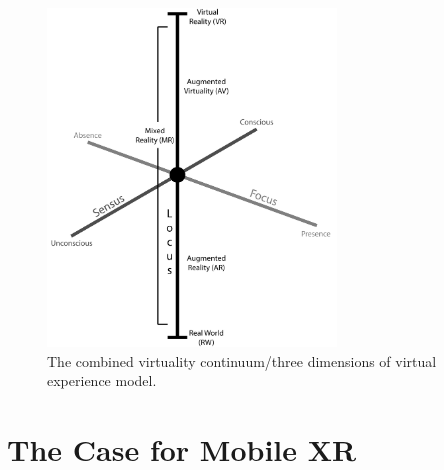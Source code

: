 \documentclass[oneside]{book}
\begin{document}
\begin{figure}[h]
	\begin{center}
		\includegraphics[width=0.685\textwidth]{images/focus-locus-sensus-with-virtuality-continuum.png}
		\caption{The combined virtuality continuum/three dimensions of virtual experience model.}
		\label{focus-locus-sensus-with-virtuality-continuum}
	\end{center}	
\end{figure}




\section{The Case for Mobile XR}

\end{document}
